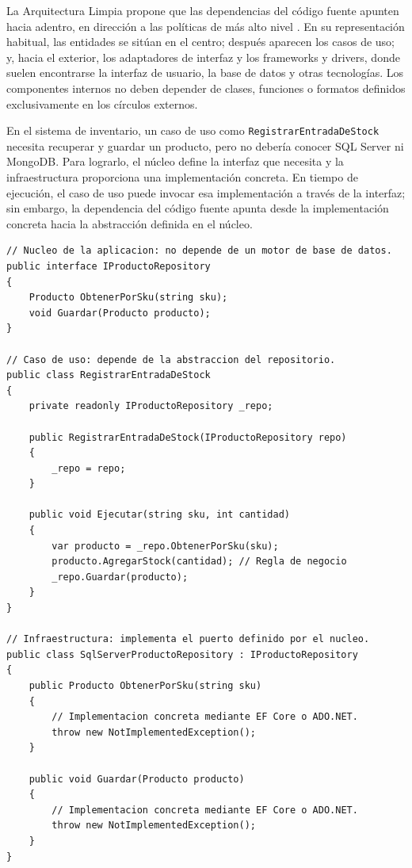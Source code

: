 La Arquitectura Limpia propone que las dependencias del código fuente apunten hacia adentro, en dirección a las políticas de más alto nivel \parencite{martin2017}. En su representación habitual, las entidades se sitúan en el centro; después aparecen los casos de uso; y, hacia el exterior, los adaptadores de interfaz y los frameworks y drivers, donde suelen encontrarse la interfaz de usuario, la base de datos y otras tecnologías. Los componentes internos no deben depender de clases, funciones o formatos definidos exclusivamente en los círculos externos.

En el sistema de inventario, un caso de uso como \texttt{RegistrarEntradaDeStock} necesita recuperar y guardar un producto, pero no debería conocer SQL Server ni MongoDB. Para lograrlo, el núcleo define la interfaz que necesita y la infraestructura proporciona una implementación concreta. En tiempo de ejecución, el caso de uso puede invocar esa implementación a través de la interfaz; sin embargo, la dependencia del código fuente apunta desde la implementación concreta hacia la abstracción definida en el núcleo.

\begin{lstlisting}[caption={Inversión de dependencias en el sistema de inventario}, label={lst:repo}]
// Nucleo de la aplicacion: no depende de un motor de base de datos.
public interface IProductoRepository
{
    Producto ObtenerPorSku(string sku);
    void Guardar(Producto producto);
}

// Caso de uso: depende de la abstraccion del repositorio.
public class RegistrarEntradaDeStock
{
    private readonly IProductoRepository _repo;

    public RegistrarEntradaDeStock(IProductoRepository repo)
    {
        _repo = repo;
    }

    public void Ejecutar(string sku, int cantidad)
    {
        var producto = _repo.ObtenerPorSku(sku);
        producto.AgregarStock(cantidad); // Regla de negocio
        _repo.Guardar(producto);
    }
}

// Infraestructura: implementa el puerto definido por el nucleo.
public class SqlServerProductoRepository : IProductoRepository
{
    public Producto ObtenerPorSku(string sku)
    {
        // Implementacion concreta mediante EF Core o ADO.NET.
        throw new NotImplementedException();
    }

    public void Guardar(Producto producto)
    {
        // Implementacion concreta mediante EF Core o ADO.NET.
        throw new NotImplementedException();
    }
}
\end{lstlisting}

